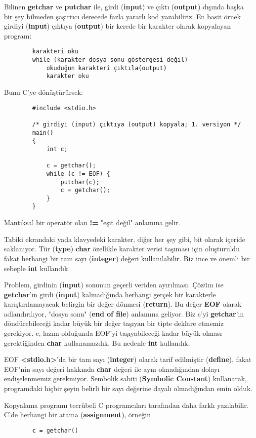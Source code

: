 \documentclass[a4paper,12pt,oneside]{book}
\begin{document}
Bilinen \textbf{getchar} ve \textbf{putchar} ile, girdi (\textbf{input}) ve çıktı (\textbf{output}) dışında başka bir şey bilmeden şaşırtıcı derecede fazla yararlı kod yazabiliriz. En basit örnek girdiyi (\textbf{input}) çıktıya (\textbf{output}) bir kerede bir karakter olarak kopyalayan program:
\begin{lstlisting}
		karakteri oku
		while (karakter dosya-sonu göstergesi değil)
			okuduğun karakteri çıktıla(output)
			karakter oku
\end{lstlisting}
Bunu C'ye dönüştürürsek:
\begin{lstlisting}
		#include <stdio.h>

		/* girdiyi (input) çıktıya (output) kopyala; 1. versiyon */
		main()
		{
			int c;

			c = getchar();
			while (c != EOF) {
				putchar(c);
				c = getchar();
			}
		}
\end{lstlisting}
Mantıksal bir operatör olan \textbf{ !=} "eşit değil" anlamına gelir.
\par Tabiki ekrandaki yada klavyedeki karakter, diğer her şey gibi, bit olarak içeride saklanıyor. Tür (\textbf{type}) \textbf{char} özellikle karakter verisi taşıması için oluşturuldu fakat herhangi bir tam sayı (\textbf{integer}) değeri kullanılabilir. Biz ince ve önemli bir sebeple \textbf{int} kullandık.
\par Problem, girdinin (\textbf{input}) sonunun geçerli veriden ayırılması. Çözüm ise \textbf{getchar}'ın girdi (\textbf{input}) kalmadığında herhangi gerçek bir karakterle karıştırılamayacak belirgin bir değer dönmesi (\textbf{return}). Bu değer \textbf{EOF} olarak adlandırılıyor, "dosya sonu" (\textbf{end of file}) anlamına geliyor. Biz c'yi \textbf{getchar}'ın döndürebileceği kadar büyük bir değer taşıyan bir tipte deklare etmemiz gerekiyor. c, lazım olduğunda EOF'yi taşıyabileceği kadar büyük olması gerektiğinden \textbf{char} kullanamazdık. Bu nedenle \textbf{int} kullandık.
\par EOF \textbf{<stdio.h>}'da bir tam sayı (\textbf{integer}) olarak tarif edilmiştir (\textbf{define}), fakat EOF'nin sayı değeri hakkında \textbf{char} değeri ile aynı olmadığından dolayı endişelenmemiz gerekmiyor. Sembolik sabiti (\textbf{Symbolic Constant}) kullanarak, programdaki hiçbir şeyin belirli bir sayı değerine dayalı olmadığından emin olduk.
\par Kopyalama programı tecrübeli C programcıları tarafından daha farklı yazılabilir. C'de herhangi bir atama (\textbf{assignment}), örneğin
\begin{lstlisting}
		c = getchar()
\end{lstlisting}
\end{document}

